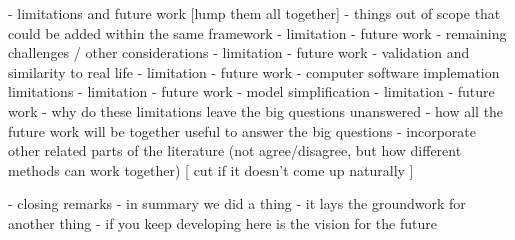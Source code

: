 - limitations and future work [lump them all together]
    - things out of scope that could be added within the same framework
        - limitation
        - future work
    - remaining challenges / other considerations
        - limitation
        - future work
    - validation and similarity to real life
        - limitation
        - future work
    - computer software implemation limitations
        - limitation
        - future work
    - model simplification
        - limitation
        - future work
    - why do these limitations leave the big questions unanswered
    - how all the future work will be together useful to answer the big questions
    - incorporate other related parts of the literature (not agree/disagree, but how different methods can work together)
        [ cut if it doesn't come up naturally ]

- closing remarks
    - in summary we did a thing
    - it lays the groundwork for another thing
    - if you keep developing here is the vision for the future
